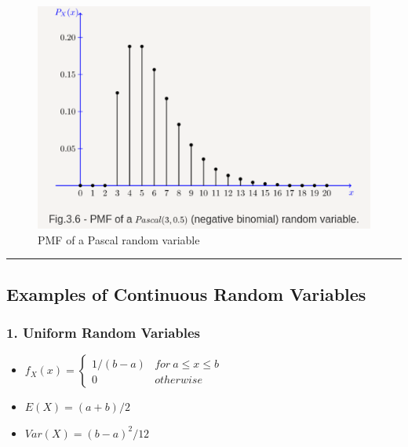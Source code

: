 \begin{figure}
\centering
\includegraphics{../Screenshot from 2021-08-07 09-44-36.png}
\caption{PMF of a Pascal random variable}
\end{figure}

\begin{center}\rule{0.5\linewidth}{0.5pt}\end{center}

\hypertarget{examples-of-continuous-random-variables}{%
\subsection{Examples of Continuous Random
Variables}\label{examples-of-continuous-random-variables}}

\hypertarget{uniform-random-variables}{%
\subsubsection{1. Uniform Random
Variables}\label{uniform-random-variables}}

\begin{itemize}
\tightlist
\item
  \(f_X(x) = \begin{cases}1/(b-a) & for \ a\leq x\leq b\\0 & otherwise\end{cases}\)
\item
  \(E(X) = (a+b)/2\)
\item
  \(Var(X) = (b-a)^2/12\)
\end{itemize}

